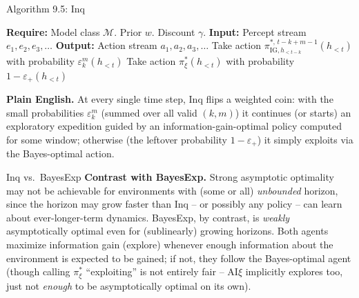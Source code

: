 \documentclass[aspectratio=169,10pt]{beamer}
\newcommand{\IG}{\mathrm{IG}}
\begin{document}
\begin{frame}{Algorithm 9.5: Inq}
  {\small
  \begin{algorithmic}[1]
    \Statex \textbf{Require:} Model class $\mathcal{M}$. Prior $w$. Discount $\gamma$.
    \Statex \textbf{Input:} Percept stream $e_1,e_2,e_3,\dots$
    \Statex \textbf{Output:} Action stream $a_1,a_2,a_3,\dots$
      \State Take action $\pi^{*,\,t-k+m-1}_{\IG,h_{<t-k}}(h_{<t})$ with probability $\varepsilon^m_k(h_{<t})$ 
      \State Take action $\pi^*_\xi(h_{<t})$ with probability $1-\varepsilon_+(h_{<t})$ 
    \EndFor
  \end{algorithmic}}
  \textbf{Plain English.} At every single time step, Inq flips a weighted
  coin: with the small probabilities $\varepsilon^m_k$ (summed over all
  valid $(k,m)$) it continues (or starts) an exploratory expedition guided
  by an information-gain-optimal policy computed for some window; otherwise
  (the leftover probability $1-\varepsilon_+$) it simply exploits via the
  Bayes-optimal action.
\end{frame}

\begin{frame}{Inq vs.\ BayesExp}
  \textbf{Contrast with BayesExp.} Strong asymptotic optimality may not be
  achievable for environments with (some or all) \emph{unbounded} horizon,
  since the horizon may grow faster than Inq -- or possibly any policy --
  can learn about ever-longer-term dynamics. BayesExp, by contrast, is
  \emph{weakly} asymptotically optimal even for (sublinearly) growing
  horizons. Both agents maximize information gain (explore) whenever
  enough information about the environment is expected to be gained; if
  not, they follow the Bayes-optimal agent (though calling $\pi^*_\xi$
  ``exploiting'' is not entirely fair -- $\mathrm{AI}\xi$ implicitly
  explores too, just not \emph{enough} to be asymptotically optimal on its
  own).
\end{frame}
\end{document}
